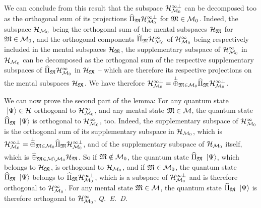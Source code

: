  We can conclude from this result that the subspace $\mathcal H_{\mathcal M_0}^{\infty \perp}$ can be decomposed too as the orthogonal sum of its projections $\widehat{\Pi}_{\mathfrak{M}} \mathcal H_{\mathcal M_0}^{\infty \perp}$ for $\mathfrak{M} \in \mathcal M_0$. Indeed, the subspace $\mathcal H_{\mathcal M_0}$ being the orthogonal sum of the mental subspaces $\mathcal H_{\mathfrak{M}}$ for $\mathfrak{M} \in \mathcal M_0$, and the orthogonal components $\widehat{\Pi}_{\mathfrak{M}} \mathcal H_{\mathcal M_0}^\infty$ of $\mathcal H_{\mathcal M_0}^\infty$ being respectively included in the mental subspaces $\mathcal H_{\mathfrak{M}}$, the supplementary subspace of $\mathcal H_{\mathcal M_0}^\infty$ in $\mathcal H_{\mathcal M_0}$ can be decomposed as the orthogonal sum of the respective supplementary subspaces of $\widehat{\Pi}_{\mathfrak{M}} \mathcal H_{\mathcal M_0}^\infty$ in $\mathcal H_{\mathfrak{M}}$ -- which are therefore its respective projections on the mental subspaces $\mathcal H_{\mathfrak{M}}$. We have therefore $\mathcal H_{\mathcal M_0}^{\infty \perp} = \overset{\perp}{\oplus}_{\mathfrak{M} \in \mathcal M_0} \widehat{\Pi}_{\mathfrak{M}} \mathcal H_{\mathcal M_0}^{\infty \perp}$.

 We can now prove the second part of the lemma: For any quantum state $\ \left|{\Psi}\right\rangle \in \mathcal H$ orthogonal to $\mathcal H_{\mathcal M_0}^\infty$, and any mental state $\mathfrak{M} \in \mathcal M$, the quantum state $\widehat{\Pi}_{\mathfrak{M}} \ \left|{\Psi}\right\rangle$ is orthogonal to $\mathcal H_{\mathcal M_0}^\infty$, too. Indeed, the supplementary subspace of $\mathcal H_{\mathcal M_0}^\infty$ is the orthogonal sum of its supplementary subspace in $\mathcal H_{\mathcal M_0}$, which is $\mathcal H_{\mathcal M_0}^{\infty \perp} = \overset{\perp}{\oplus}_{\mathfrak{M} \in \mathcal M_0} \widehat{\Pi}_{\mathfrak{M}} \mathcal H_{\mathcal M_0}^{\infty \perp}$, and of the supplementary subspace of $\mathcal H_{\mathcal M_0}$ itself, which is $\overset{\perp}{\oplus}_{\mathfrak{M} \in \mathcal M \setminus \mathcal M_0} \mathcal H_{\mathfrak{M}}$. So if $\mathfrak{M} \notin \mathcal M_0$, the quantum state $\widehat{\Pi}_{\mathfrak{M}} \ \left|{\Psi}\right\rangle$, which belongs to $\mathcal H_{\mathfrak{M}}$, is orthogonal to $\mathcal H_{\mathcal M_0}$, and if $\mathfrak{M} \in \mathcal M_0$, the quantum state $\widehat{\Pi}_{\mathfrak{M}} \ \left|{\Psi}\right\rangle$ belongs to $\widehat{\Pi}_{\mathfrak{M}} \mathcal H_{\mathcal M_0}^{\infty \perp}$, which is a subspace of $\mathcal H_{\mathcal M_0}^{\infty \perp}$ and is therefore orthogonal to $\mathcal H_{\mathcal M_0}^\infty$. For any mental state $\mathfrak{M} \in \mathcal M$, the quantum state $\widehat{\Pi}_{\mathfrak{M}} \ \left|{\Psi}\right\rangle$ is therefore orthogonal to $\mathcal H_{\mathcal M_0}^\infty$, \textit{Q.~E.~D.}

